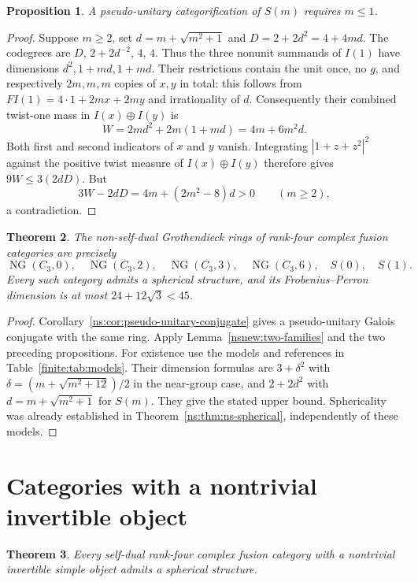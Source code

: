 \documentclass[11pt,a4paper]{article}
\newtheorem{theorem}{Theorem}[section]
\newtheorem{proposition}[theorem]{Proposition}
\theoremstyle{definition}\newtheorem{definition}[theorem]{Definition}
\theoremstyle{remark}\newtheorem{remark}[theorem]{Remark}
\numberwithin{equation}{section}
\begin{document}
\begin{proposition}\label{nsnew:second-family}
A pseudo-unitary categorification of $S(m)$ requires $m\le1$.
\end{proposition}
\begin{proof}
Suppose $m\ge2$, set $d=m+\sqrt{m^2+1}$ and
$D=2+2d^2=4+4md$. The codegrees are $D$, $2+2d^{-2}$, $4$, $4$.
Thus the three nonunit summands of $I(1)$ have dimensions
$d^2,1+md,1+md$. Their restrictions contain the unit once, no $g$,
and respectively $2m,m,m$ copies of $x,y$ in total: this follows
from $FI(1)=4\cdot1+2mx+2my$ and irrationality of $d$.
Consequently their combined twist-one mass in $I(x)\oplus I(y)$ is
\[
 W=2md^2+2m(1+md)=4m+6m^2d.
\]
Both first and second indicators of $x$ and $y$ vanish. Integrating
$|1+z+z^2|^2$ against the positive twist measure of
$I(x)\oplus I(y)$ therefore gives $9W\le3(2dD)$.
But
\[
 3W-2dD=4m+(2m^2-8)d>0\qquad(m\ge2),
\]
a contradiction.
\end{proof}

\begin{theorem}\label{nsnew:classification}
The non-self-dual Grothendieck rings of rank-four complex fusion
categories are precisely
\[
 \operatorname{NG}(C_3,0),\quad\operatorname{NG}(C_3,2),\quad
 \operatorname{NG}(C_3,3),\quad\operatorname{NG}(C_3,6),\quad
 S(0),\quad S(1).
\]
Every such category admits a spherical structure, and its
Frobenius--Perron dimension is at most $24+12\sqrt3<45$.
\end{theorem}
\begin{proof}
Corollary~\ref{ns:cor:pseudo-unitary-conjugate} gives a pseudo-unitary
Galois conjugate with the same ring. Apply
Lemma~\ref{nsnew:two-families} and the two preceding propositions.
For existence use the models and references in
Table~\ref{finite:tab:models}. Their dimension formulas are
$3+\delta^2$ with $\delta=(m+\sqrt{m^2+12})/2$ in the near-group
case, and $2+2d^2$ with $d=m+\sqrt{m^2+1}$ for $S(m)$.
They give the stated upper bound. Sphericality was already established
in Theorem~\ref{ns:thm:ns-spherical}, independently of these models.
\end{proof}
\section{Categories with a nontrivial invertible object}\label{sec:inv}
\begin{theorem}\label{inv:thm:rankfour-invertible-spherical}
Every self-dual rank-four complex fusion category with a nontrivial
invertible simple object admits a spherical structure.
\end{theorem}
\end{document}
